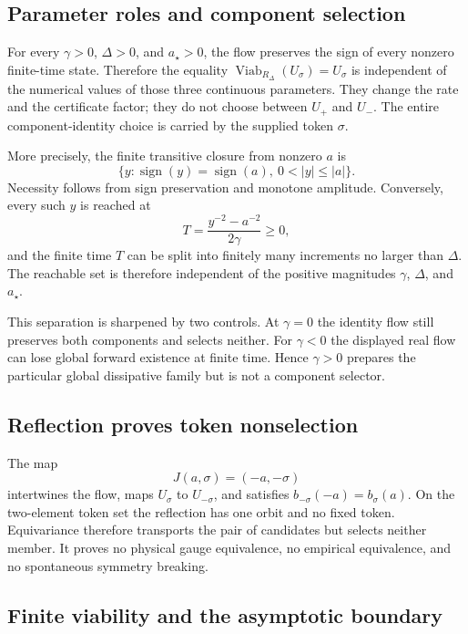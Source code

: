 \documentclass[11pt]{article}
\newcommand{\Viab}{\operatorname{Viab}}
\begin{document}
\subsection{Parameter roles and component selection}

For every $\gamma>0$, $\Delta>0$, and $a_\star>0$, the flow preserves the
sign of every nonzero finite-time state.  Therefore the equality
$\Viab_{R_\Delta}(U_\sigma)=U_\sigma$ is independent of the numerical values
of those three continuous parameters.  They change the rate and the
certificate factor; they do not choose between $U_+$ and $U_-$.  The entire
component-identity choice is carried by the supplied token $\sigma$.

More precisely, the finite transitive closure from nonzero $a$ is
\[
 \{y:\operatorname{sign}(y)=\operatorname{sign}(a),\ 0<|y|\le |a|\}.
\]
Necessity follows from sign preservation and monotone amplitude.  Conversely,
every such $y$ is reached at
\[
 T=\frac{y^{-2}-a^{-2}}{2\gamma}\ge0,
\]
and the finite time $T$ can be split into finitely many increments no larger
than $\Delta$.  The reachable set is therefore independent of the positive
magnitudes $\gamma$, $\Delta$, and $a_\star$.

This separation is sharpened by two controls.  At $\gamma=0$ the identity
flow still preserves both components and selects neither.  For $\gamma<0$ the
displayed real flow can lose global forward existence at finite time.  Hence
$\gamma>0$ prepares the particular global dissipative family but is not a
component selector.

\subsection{Reflection proves token nonselection}

The map
\[
 J(a,\sigma)=(-a,-\sigma)
\]
intertwines the flow, maps $U_\sigma$ to $U_{-\sigma}$, and satisfies
$b_{-\sigma}(-a)=b_\sigma(a)$.  On the two-element token set the reflection
has one orbit and no fixed token.  Equivariance therefore transports the pair
of candidates but selects neither member.  It proves no physical gauge
equivalence, no empirical equivalence, and no spontaneous symmetry breaking.

\subsection{Finite viability and the asymptotic boundary}
\end{document}
